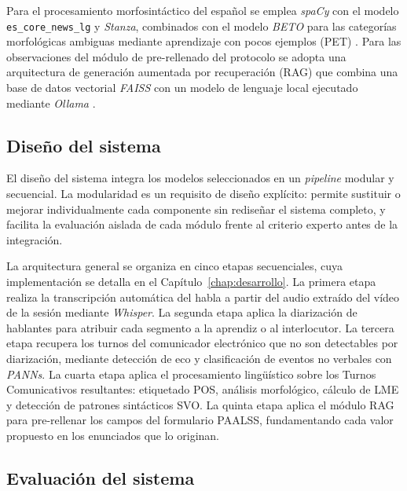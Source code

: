 Para el procesamiento morfosintáctico del español se emplea \emph{spaCy} con el modelo \\
\texttt{es\_core\_news\_lg} \cite{spoken_spanish_pos} y \emph{Stanza}, combinados con
el modelo \emph{BETO} \cite{beto_morphological} para las categorías morfológicas
ambiguas mediante aprendizaje con pocos ejemplos (\ac{PET}) \cite{fewshot_clinical_nlp}.
Para las observaciones del módulo de pre-rellenado del protocolo se adopta una 
arquitectura de generación aumentada por recuperación (\ac{RAG}) que combina una base 
de datos vectorial \emph{FAISS} con un modelo de lenguaje local ejecutado mediante
\emph{Ollama} \cite{ollama}.


\subsection{Diseño del sistema}
\label{subsec:design_sistema}

El diseño del sistema integra los modelos seleccionados en un \emph{pipeline} modular
y secuencial. La modularidad es un requisito de diseño explícito: permite sustituir
o mejorar individualmente cada componente sin rediseñar el sistema completo, y facilita
la evaluación aislada de cada módulo frente al criterio experto antes de la integración.

La arquitectura general se organiza en cinco etapas secuenciales, cuya implementación
se detalla en el Capítulo~\ref{chap:desarrollo}. La primera etapa realiza la
transcripción automática del habla a partir del audio extraído del vídeo de la sesión
mediante \emph{Whisper}. La segunda etapa aplica la diarización de hablantes para
atribuir cada segmento a la aprendiz o al interlocutor. La tercera etapa recupera los
turnos del comunicador electrónico que no son detectables por diarización, mediante
detección de eco y clasificación de eventos no verbales con \emph{PANNs}. La cuarta
etapa aplica el procesamiento lingüístico sobre los Turnos Comunicativos resultantes:
etiquetado \ac{POS}, análisis morfológico, cálculo de \ac{LME} y detección de patrones
sintácticos \ac{SVO}. La quinta etapa aplica el módulo \ac{RAG} para pre-rellenar los
campos del formulario \ac{PAALSS}, fundamentando cada valor propuesto en los enunciados
que lo originan.


\subsection{Evaluación del sistema}
\label{subsec:evaluacion}


